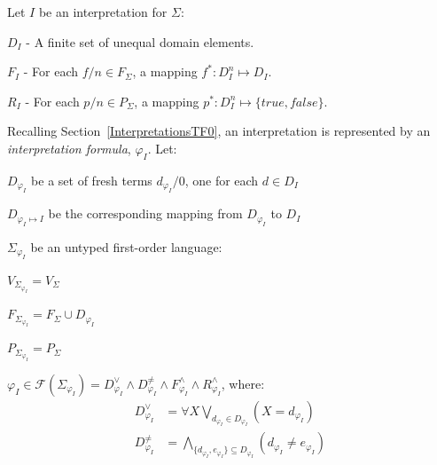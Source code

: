 \documentclass[letterpaper]{article}
\newenvironment{packed_itemize}{
\vspace*{-0.2em}
\begin{itemize}
\setlength{\partopsep}{0pt}
\setlength{\itemsep}{1pt}
\setlength{\parskip}{0pt}
\setlength{\parsep}{0pt}
}{\end{itemize}}
\newcommand{\true}{{\mathit{true}}}
\newcommand{\false}{{\mathit{false}}}
\begin{document}
\vspace*{1em}
\noindent
Let $I$ be an interpretation for $\Sigma$:
\begin{packed_itemize}
\item $D_I$ - A finite set of unequal domain elements.
\item $F_I$ - For each $f/n \in F_\Sigma$, a mapping $f^*: D_I^n \mapsto D_I$.
\item $R_I$ - For each $p/n \in P_\Sigma$, a mapping $p^*: D_I^n \mapsto \{\true,\false\}$.
\end{packed_itemize}

\noindent
Recalling Section~\ref{InterpretationsTF0}, an interpretation is represented by an 
{\em interpretation formula}, $\varphi_I$.
Let:
\begin{packed_itemize}
\item $D_{\varphi_I}$ be a set of fresh terms $d_{\varphi_I}/0$, one for each $d \in D_I$
\item $D_{\varphi_I \mapsto I}$ be the corresponding mapping from $D_{\varphi_I}$ to $D_I$
\item $\Sigma_{\varphi_I}$ be an untyped first-order language:
      \begin{packed_itemize}
      \item $V_{\Sigma_{\varphi_I}} = V_\Sigma$
      \item $F_{\Sigma_{\varphi_I}} = F_\Sigma \cup D_{\varphi_I}$
      \item $P_{\Sigma_{\varphi_I}} = P_\Sigma$
      \end{packed_itemize}
\item $\varphi_I \in \mathcal{F}(\Sigma_{\varphi_I}) = 
D^\vee_{\varphi_I} \land D^{\neq}_{\varphi_I} \land F^\wedge_{\varphi_I} \land 
R^\wedge_{\varphi_I}$, where:
\begin{equation*}
\begin{split}
D^\vee_{\varphi_I}   &= \forall X \bigvee_{d_{\varphi_I} \in D_{\varphi_I}} \left(X = d_{\varphi_I} \right) \\
D^{\neq}_{\varphi_I} &= \bigwedge_{\{d_{\varphi_I},e_{\varphi_I}\} \subseteq D_{\varphi_I}} \left(d_{\varphi_I} \neq e_{\varphi_I} \right) \\

\end{split}
\end{equation*}
\end{packed_itemize}
\end{document}
